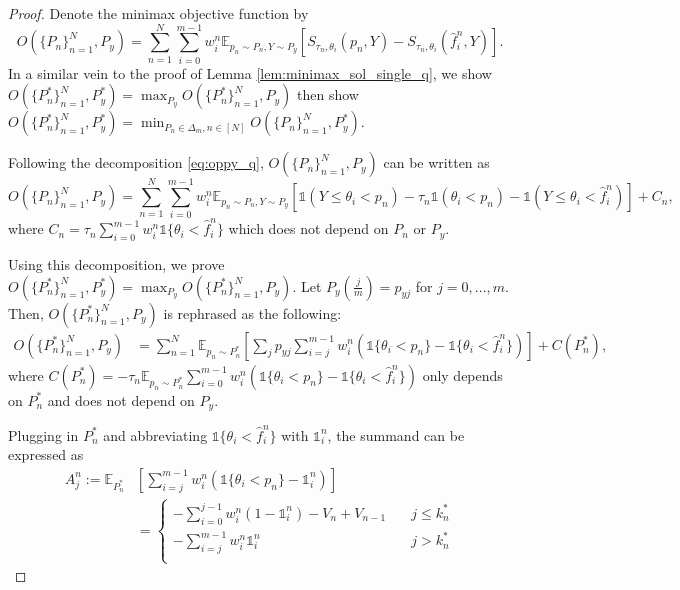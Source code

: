 \documentclass{article}
\newcommand{\one}{\mathds{1}}
\newcommand{\indi}[1]{\mathds{1}\{#1\}}
\newcommand{\E}{\mathbb{E}}
\begin{document}
\begin{proof}
Denote the minimax objective function by 
\[O(\{P_n\}_{n=1}^N, P_y) = \sum_{n=1}^N \sum_{i=0}^{m-1} w_i^n \E_{p_n \sim P_n, Y \sim P_y}[S_{\tau_n,\theta_i}(p_n,Y) - S_{\tau_n,\theta_i}(\hat{f}_i^n,Y)].
\]
In a similar vein to the proof of Lemma \ref{lem:minimax_sol_single_q}, we show $O(\{P_n^*\}_{n=1}^N, P_y^*) = \max_{P_y} O(\{P_n^*\}_{n=1}^N, P_y)$ then show $O(\{P_n^*\}_{n=1}^N, P_y^*) = \min_{P_n \in \Delta_m, n\in[N]} O(\{P_n\}_{n=1}^N, P_y^*)$.

Following the decomposition \eqref{eq:oppy_q}, $O(\{P_n\}_{n=1}^N, P_y)$ can be written as
\[
O(\{P_n\}_{n=1}^N, P_y) = \sum_{n=1}^N \sum_{i=0}^{m-1} w_i^n \E_{p_n \sim P_n, Y \sim P_y}[\one(Y \leq \theta_i < p_n) - \tau_n \one(\theta_i<p_n) - \one(Y \leq \theta_i < \hat{f}_i^n)] + C_n,
\]
where $C_n =\tau_n \sum_{i=0}^{m-1} w_i^n \indi{\theta_i < \hat{f}_i^n}$ which does not depend on $P_n$ or $P_y$.

Using this decomposition, we prove $O(\{P_n^*\}_{n=1}^N, P_y^*) = \max_{P_y} O(\{P_n^*\}_{n=1}^N, P_y)$. Let $P_y(\frac{j}{m})=p_{yj}$ for $j=0,...,m$. Then, $O(\{P_n^*\}_{n=1}^N, P_y)$ is rephrased as the following:
\begin{align}\label{eq:O_Pstar_Py_decomp}
O(\{P_n^*\}_{n=1}^N, P_y) 
& = \sum_{n=1}^N \E_{p_n \sim P_n^*} \left[\sum_j p_{yj} \sum_{i=j}^{m-1} w_i^n \left( \indi{\theta_i < p_n} - \indi{\theta_i < \hat{f}_i^n}\right)\right] + C(P_n^*),
\end{align}
where $C(P_n^*) = - \tau_n \E_{p_n \sim P_n^*} \sum_{i=0}^{m-1} w_i^n (\indi{\theta_i < p_n} - \indi{\theta_i < \hat{f}_i^n})$ only depends on $P_n^*$ and does not depend on $P_y$.

Plugging in $P_n^*$ and abbreviating $\indi{\theta_i < \hat{f}_i^n}$ with $\one_i^n$, the summand can be expressed as 
\begin{align*}
A_j^n := \E_{P_n^*} & \left[\sum_{i=j}^{m-1} w_i^n \left( \indi{\theta_i < p_n} - \one_i^n\right)\right] \\
& = 
\begin{cases}
-\sum_{i=0}^{j-1} w_i^n (1-\one_i^n) - V_n + V_{n-1} & \quad j \leq k_n^* \\
- \sum_{i=j}^{m-1} w_i^n \one_i^n & \quad j > k_n^* \\
\end{cases} 
\end{align*}


\end{proof}
\end{document}
